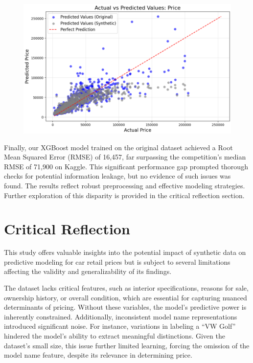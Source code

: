 \documentclass[a4paper,oneside,bibliography=totoc]{scrbook}
\begin{document}
\begin{figure}
	\includegraphics[width=\linewidth]{images/xgb_results_mixed.png}
	\centering
\end{figure}

Finally, our XGBoost model trained on the original dataset achieved a Root Mean Squared Error (RMSE) of 16,457, far surpassing the competition's median RMSE of 71,900 on Kaggle. This significant performance gap prompted thorough checks for potential information leakage, but no evidence of such issues was found. The results reflect robust preprocessing and effective modeling strategies. Further exploration of this disparity is provided in the critical reflection section.

\chapter{Critical Reflection}
\label{cha:criticalReflection}

This study offers valuable insights into the potential impact of synthetic data on predictive modeling for car retail prices but is subject to several limitations affecting the validity and generalizability of its findings.

The dataset lacks critical features, such as interior specifications, reasons for sale, ownership history, or overall condition, which are essential for capturing nuanced determinants of pricing. Without these variables, the model's predictive power is inherently constrained. Additionally, inconsistent model name representations introduced significant noise. For instance, variations in labeling a ``VW Golf'' hindered the model's ability to extract meaningful distinctions. Given the dataset's small size, this issue further limited learning, forcing the omission of the model name feature, despite its relevance in determining price.
\end{document}
